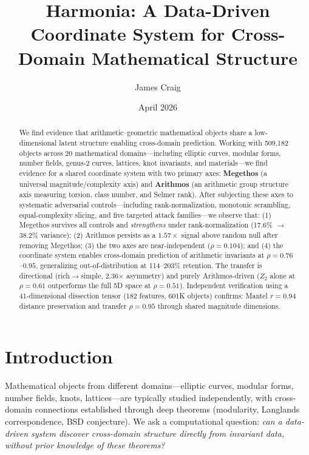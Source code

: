 \documentclass[11pt,a4paper]{article}
\title{Harmonia: A Data-Driven Coordinate System for Cross-Domain Mathematical Structure}
\author[1]{James Craig}
\affil[1]{JFI Research}
\date{April 2026}
\begin{document}
\maketitle

\begin{abstract}
We find evidence that arithmetic--geometric mathematical objects share a low-dimensional latent structure enabling cross-domain prediction. Working with 509,182 objects across 20 mathematical domains---including elliptic curves, modular forms, number fields, genus-2 curves, lattices, knot invariants, and materials---we find evidence for a shared coordinate system with two primary axes: \textbf{Megethos} (a universal magnitude/complexity axis) and \textbf{Arithmos} (an arithmetic group structure axis measuring torsion, class number, and Selmer rank). After subjecting these axes to systematic adversarial controls---including rank-normalization, monotonic scrambling, equal-complexity slicing, and five targeted attack families---we observe that: (1) Megethos survives all controls and \emph{strengthens} under rank-normalization (17.6\% $\to$ 38.2\% variance); (2) Arithmos persists as a $1.57\times$ signal above random null after removing Megethos; (3) the two axes are near-independent ($\rho = 0.104$); and (4) the coordinate system enables cross-domain prediction of arithmetic invariants at $\rho = 0.76$--$0.95$, generalizing out-of-distribution at 114--203\% retention. The transfer is directional (rich$\to$simple, 2.36$\times$ asymmetry) and purely Arithmos-driven ($Z_2$ alone at $\rho = 0.61$ outperforms the full 5D space at $\rho = 0.51$). Independent verification using a 41-dimensional dissection tensor (182 features, 601K objects) confirms: Mantel $r = 0.94$ distance preservation and transfer $\rho = 0.95$ through shared magnitude dimensions.
\end{abstract}

\section{Introduction}

Mathematical objects from different domains---elliptic curves, modular forms, number fields, knots, lattices---are typically studied independently, with cross-domain connections established through deep theorems (modularity, Langlands correspondence, BSD conjecture). We ask a computational question: \emph{can a data-driven system discover cross-domain structure directly from invariant data, without prior knowledge of these theorems?}
\end{document}
